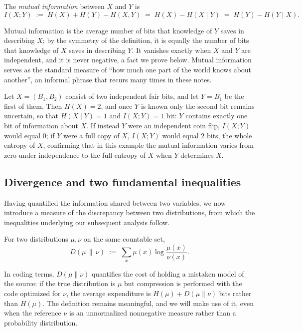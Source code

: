 \documentclass[11pt]{article}
\begin{document}
\begin{definition}
\label{def:mi}
The \emph{mutual information} between $X$ and $Y$ is
\[
I(X;Y) \;:=\; H(X) + H(Y) - H(X,Y) \;=\; H(X) - H(X \mid Y) \;=\; H(Y) - H(Y \mid X).
\]
\end{definition}

Mutual information is the average number of bits that knowledge of $Y$ saves in describing $X$; by the symmetry of the definition, it is equally the number of bits that knowledge of $X$ saves in describing $Y$. It vanishes exactly when $X$ and $Y$ are independent, and it is never negative, a fact we prove below. Mutual information serves as the standard measure of ``how much one part of the world knows about another'', an informal phrase that recurs many times in these notes.

\begin{example}
Let $X = (B_1, B_2)$ consist of two independent fair bits, and let $Y = B_1$ be the first of them. Then $H(X) = 2$, and once $Y$ is known only the second bit remains uncertain, so that $H(X \mid Y) = 1$ and $I(X;Y) = 1$ bit: $Y$ contains exactly one bit of information about $X$. If instead $Y$ were an independent coin flip, $I(X;Y)$ would equal $0$; if $Y$ were a full copy of $X$, $I(X;Y)$ would equal $2$ bits, the whole entropy of $X$, confirming that in this example the mutual information varies from zero under independence to the full entropy of $X$ when $Y$ determines $X$.
\end{example}

\subsection{Divergence and two fundamental inequalities}

Having quantified the information shared between two variables, we now introduce a measure of the discrepancy between two distributions, from which the inequalities underlying our subsequent analysis follow.

\begin{definition}
For two distributions $\mu, \nu$ on the same countable set,
\[
D(\mu \,\|\, \nu) \;:=\; \sum_x \mu(x) \log \frac{\mu(x)}{\nu(x)} .
\]
\end{definition}

In coding terms, $D(\mu \| \nu)$ quantifies the cost of holding a mistaken model of the source: if the true distribution is $\mu$ but compression is performed with the code optimized for $\nu$, the average expenditure is $H(\mu) + D(\mu\|\nu)$ bits rather than $H(\mu)$. The definition remains meaningful, and we will make use of it, even when the reference $\nu$ is an unnormalized nonnegative measure rather than a probability distribution.
\end{document}
